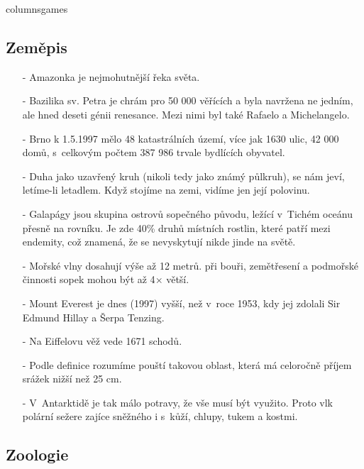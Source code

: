 \begin{multicols}{\value{columnsgames}columnsgames}
\begin{itemize}
\end{itemize}

\subsection{Zeměpis}

\begin{itemize}
\itemsep -3pt

\item[-] Amazonka je nejmohutnější řeka světa.

\item[-] Bazilika sv. Petra je chrám pro 50 000 věřících a byla navržena 
ne jedním, ale hned deseti génii renesance. Mezi nimi byl také 
Rafaelo a Michelangelo.

\item[-] Brno k 1.5.1997 mělo 48 katastrálních území, více jak 1630 ulic, 
42 000 domů, s~celkovým počtem 387 986 trvale bydlících 
obyvatel.

\item[-] Duha jako uzavřený kruh (nikoli tedy jako známý půlkruh), se 
nám jeví, letíme-li letadlem. Když stojíme na zemi, vidíme 
jen její polovinu.

\item[-] Galapágy jsou skupina ostrovů sopečného původu, ležící v~Tichém 
oceánu přesně na rovníku. Je zde 40\% druhů místních rostlin, 
které patří mezi endemity, což znamená, že se nevyskytují nikde 
jinde na světě.

\item[-] Mořské vlny dosahují výše až 12 metrů. při bouři, zemětřesení 
a podmořské činnosti sopek mohou být až 4$\times$ větší.

\item[-] Mount Everest je dnes (1997) vyšší, než v~roce 1953, 
kdy jej zdolali Sir Edmund Hillay a Šerpa Tenzing.

\item[-] Na Eiffelovu věž vede 1671 schodů.

\item[-] Podle definice rozumíme pouští takovou oblast, která má celoročně 
příjem srážek nižší než 25 cm.

\item[-] V~Antarktidě je tak málo potravy, že vše musí být využito. 
Proto vlk polární sežere zajíce sněžného i s~kůží, chlupy, 
tukem a kostmi.

\end{itemize}

\subsection{Zoologie}


\end{multicols}
